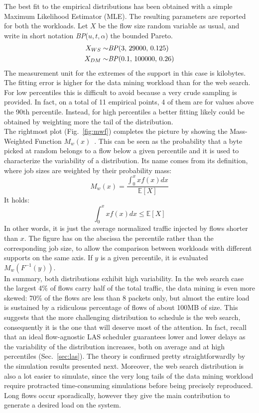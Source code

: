 The best fit to the empirical distributions has been obtained with a simple Maximum Likelihood Estimator (MLE). The resulting parameters are reported for both the workloads. Let $X$ be the flow size random variable as usual, and write in short notation \textit{BP}($u,t,\alpha$) the bounded Pareto. 
\begin{align*}
	X_{WS} \sim& \text{\textit{BP}}(3, \, 29000, \, 0.125)\\
	X_{DM} \sim& \text{\textit{BP}}(0.1, \, 100000, \,0.26)
\end{align*}
The measurement unit for the extremes of the support in this case is kilobytes. The fitting error is higher for the data mining workload than for the web search. For low percentiles this is difficult to avoid because a very crude sampling is provided. In fact, on a total of 11 empirical points, 4 of them are for values above the 90th percentile. Instead, for high percentiles a better fitting likely could be obtained by weighting more the tail of the distribution. \\
The rightmost plot (Fig.~\ref{fig:mwf}) completes the picture by showing the Mass-Weighted Function $M_w(x)$~\cite{mwf}. This can be seen as the probability that a byte picked at random belongs to a flow below a given percentile and it is used to characterize the variability of a distribution. Its name comes from its definition, where job sizes are weighted by their probability mass:
\[
M_w(x) = \dfrac{\int_{0}^{x} x f(x) dx}{\mathbb{E}[X]}
\]
It holds:
\[
\int\nolimits_{0}^{x} x f(x) dx \le \mathbb{E}[X]
\]
In other words, it is just the average normalized traffic injected by flows shorter than $x$. The figure has on the abscissa the percentile rather than the corresponding job size, to allow the comparison between workloads with different supports on the same axis. If $y$ is a given percentile, it is evaluated $M_w(F^{-1}(y))$. \\
In summary, both distributions exhibit high variability. In the web search case the largest 4\% of flows carry half of the total traffic, the data mining is even more skewed: 70\% of the flows are less than 8 packets only, but almost the entire load is sustained by a ridiculous percentage of flows of about 100MB of size. This suggests that the more challenging distribution to schedule is the web search, consequently it is the one that will deserve most of the attention. In fact, recall that an ideal flow-agnostic LAS scheduler guarantees lower and lower delays as the variability of the distribution increases, both on average and at high percentiles (Sec.~\ref{sec:las}). The theory is confirmed pretty straightforwardly by the simulation results presented next. Moreover, the web search distribution is also a lot easier to simulate, since the very long tails of the data mining workload require protracted time-consuming simulations before being precisely reproduced. Long flows occur sporadically, however they give the main contribution to generate a desired load on the system. 

